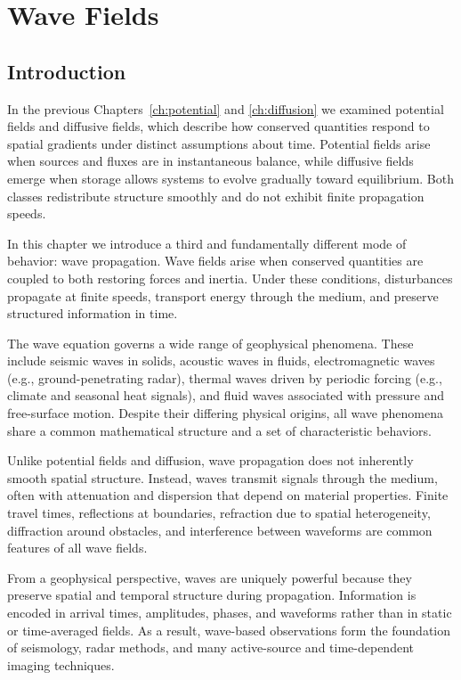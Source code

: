 \chapter{Wave Fields}\label{ch:waves}

\section{Introduction}

In the previous Chapters~\ref{ch:potential} and \ref{ch:diffusion} we examined potential fields and diffusive fields, which describe how conserved quantities respond to spatial gradients under distinct assumptions about time. Potential fields arise when sources and fluxes are in instantaneous balance, while diffusive fields emerge when storage allows systems to evolve gradually toward equilibrium. Both classes redistribute structure smoothly and do not exhibit finite propagation speeds.

In this chapter we introduce a third and fundamentally different mode of behavior: wave propagation. Wave fields arise when conserved quantities are coupled to both restoring forces and inertia. Under these conditions, disturbances propagate at finite speeds, transport energy through the medium, and preserve structured information in time.

The wave equation governs a wide range of geophysical phenomena. These include seismic waves in solids, acoustic waves in fluids, electromagnetic waves (e.g., ground-penetrating radar), thermal waves driven by periodic forcing (e.g., climate and seasonal heat signals), and fluid waves associated with pressure and free-surface motion. Despite their differing physical origins, all wave phenomena share a common mathematical structure and a set of characteristic behaviors.

Unlike potential fields and diffusion, wave propagation does not inherently smooth spatial structure. Instead, waves transmit signals through the medium, often with attenuation and dispersion that depend on material properties. Finite travel times, reflections at boundaries, refraction due to spatial heterogeneity, diffraction around obstacles, and interference between waveforms are common features of all wave fields.

From a geophysical perspective, waves are uniquely powerful because they preserve spatial and temporal structure during propagation. Information is encoded in arrival times, amplitudes, phases, and waveforms rather than in static or time-averaged fields. As a result, wave-based observations form the foundation of seismology, radar methods, and many active-source and time-dependent imaging techniques.

